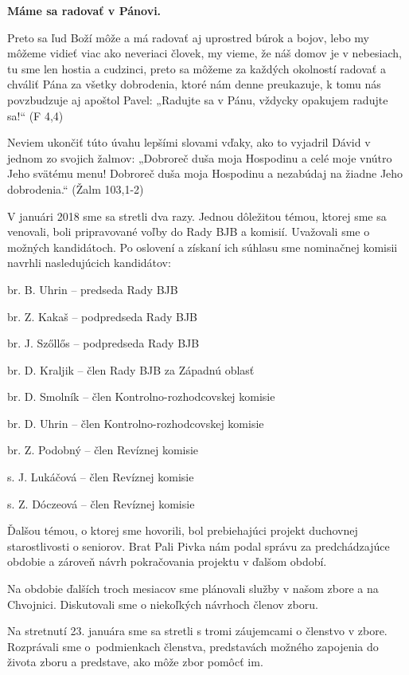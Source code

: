 {\bf Máme sa radovať v Pánovi.}

Preto sa ľud Boží môže a má radovať aj uprostred búrok a bojov, lebo my môžeme vidieť viac ako neveriaci človek, my vieme, že náš domov je v nebesiach, tu sme len hostia a cudzinci, preto sa môžeme za každých okolností radovať a chváliť Pána za všetky dobrodenia, ktoré nám denne preukazuje, k tomu nás povzbudzuje aj apoštol Pavel: „Radujte sa v Pánu, vždycky opakujem radujte sa!“ (F 4,4)

Neviem ukončiť túto úvahu lepšími slovami vďaky, ako to vyjadril Dávid v jednom zo svojich žalmov: „Dobroreč duša moja Hospodinu a celé moje vnútro Jeho svätému menu! Dobroreč duša moja Hospodinu a nezabúdaj na žiadne Jeho dobrodenia.“ (Žalm 103,1-2)


V januári 2018 sme sa stretli dva razy. Jednou dôležitou témou, ktorej sme sa venovali, boli pripravované voľby do Rady BJB a komisií. Uvažovali sme o možných kandidátoch. Po  oslovení a získaní ich súhlasu sme nominačnej komisii navrhli nasledujúcich kandidátov:

br. B. Uhrin – predseda Rady BJB

br. Z. Kakaš – podpredseda Rady BJB

br. J. Szőllős – podpredseda Rady BJB

br. D. Kraljik – člen Rady BJB za Západnú oblasť

br. D. Smolník – člen Kontrolno-rozhodcovskej komisie

br. D. Uhrin – člen Kontrolno-rozhodcovskej komisie

br. Z. Podobný – člen Revíznej komisie

s. J. Lukáčová – člen Revíznej komisie

s. Z. Dóczeová – člen Revíznej komisie

Ďalšou témou, o ktorej sme hovorili, bol prebiehajúci projekt duchovnej starostlivosti o seniorov. Brat Pali Pivka nám podal správu za predchádzajúce obdobie a zároveň návrh pokračovania projektu v ďalšom období.

Na obdobie ďalších troch mesiacov sme plánovali služby v našom zbore a na Chvojnici.
Diskutovali sme o niekoľkých návrhoch členov zboru.

Na stretnutí 23. januára sme sa stretli s tromi záujemcami o členstvo v zbore. Rozprávali sme o~podmienkach členstva, predstavách možného zapojenia do života zboru a predstave, ako môže zbor pomôcť im.

